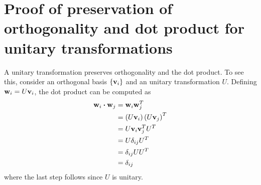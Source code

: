 \documentclass[aps,reprint]{revtex4-1}
\newcommand\blankpage{%
  \null
  \thispagestyle{empty}%
  \addtocounter{page}{-1}%
  \newpage}
\begin{document}
\section{Proof of preservation of orthogonality and dot product for unitary transformations}
A unitary transformation preserves orthogonality and the dot product. To see
this, consider an orthogonal basis \(\{\vb{v}_{i}\}\) and an unitary
transformation \(U\). Defining \(\vb{w}_{i}=U\vb{v}_{i}\), the dot product can
be computed as
\begin{align*}
  \vb{w}_{i}\vdot \vb{w}_{j} &= \vb{w}_{i}\vb{w}_{j}^{T}\\
                             &= \left( U\vb{v}_{i} \right)\left( U\vb{v}_{j} \right)^{T}\\
                             &= U\vb{v}_{i}\vb{v}_{j}^{T}U^{T}\\
                             &= U\delta_{ij}U^{T}\\
                             &= \delta_{ij}UU^{T}\\
                             &= \delta_{ij}
\end{align*}
where the last step follows since \(U\) is unitary.
\blankpage
\end{document}
